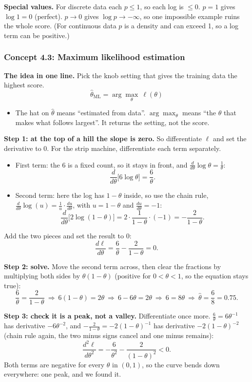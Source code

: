 \documentclass[12pt,a4paper]{article}
\begin{document}
\textbf{Special values.} For discrete data each $p\le1$, so each log is $\le0$. $p=1$ gives $\log1=0$ (perfect). $p\to0$ gives $\log p\to-\infty$, so one impossible example ruins the whole score. (For continuous data $p$ is a density and can exceed 1, so a log term can be positive.)

\subsubsection{Concept 4.3: Maximum likelihood estimation}\label{c4-3}

\textbf{The idea in one line.} Pick the knob setting that gives the training data the highest score.
\[
\hat\theta_{\text{ML}}=\arg\max_\theta\ \ell(\theta)
\]
\begin{itemize}[nosep]
  \item The hat on $\hat\theta$ means ``estimated from data''. $\arg\max_\theta$ means ``the $\theta$ that makes what follows largest''. It returns the setting, not the score.
\end{itemize}

\textbf{Step 1: at the top of a hill the slope is zero.} So differentiate $\ell$ and set the derivative to 0. For the strip machine, differentiate each term separately.
\begin{itemize}[nosep]
  \item First term: the 6 is a fixed count, so it stays in front, and $\frac{d}{d\theta}\log\theta=\frac1\theta$:
  \[
  \frac{d}{d\theta}\big[6\log\theta\big]=\frac{6}{\theta}.
  \]
  \item Second term: here the log has $1-\theta$ inside, so use the chain rule, $\frac{d}{d\theta}\log(u)=\frac1u\cdot\frac{du}{d\theta}$, with $u=1-\theta$ and $\frac{du}{d\theta}=-1$:
  \[
  \frac{d}{d\theta}\big[2\log(1-\theta)\big]=2\cdot\frac{1}{1-\theta}\cdot(-1)=-\frac{2}{1-\theta}.
  \]
\end{itemize}
Add the two pieces and set the result to 0:
\[
\frac{d\ell}{d\theta}=\frac{6}{\theta}-\frac{2}{1-\theta}=0 .
\]

\textbf{Step 2: solve.} Move the second term across, then clear the fractions by multiplying both sides by $\theta(1-\theta)$ (positive for $0<\theta<1$, so the equation stays true):
\[
\frac{6}{\theta}=\frac{2}{1-\theta}\ \Rightarrow\ 6(1-\theta)=2\theta\ \Rightarrow\ 6-6\theta=2\theta\ \Rightarrow\ 6=8\theta\ \Rightarrow\ \hat\theta=\frac68=0.75 .
\]

\textbf{Step 3: check it is a peak, not a valley.} Differentiate once more. $\frac{6}{\theta}=6\theta^{-1}$ has derivative $-6\theta^{-2}$, and $-\frac{2}{1-\theta}=-2(1-\theta)^{-1}$ has derivative $-2(1-\theta)^{-2}$ (chain rule again, the two minus signs cancel and one minus remains):
\[
\frac{d^2\ell}{d\theta^2}=-\frac{6}{\theta^2}-\frac{2}{(1-\theta)^2}<0 .
\]
Both terms are negative for every $\theta$ in $(0,1)$, so the curve bends down everywhere: one peak, and we found it.
\end{document}
